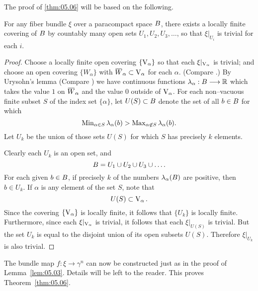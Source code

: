 \documentclass[../main]{subfiles}
\begin{document}
The proof of \ref{thm:05.06} will be based on the following.
\setcounter{theorem}{8}
\begin{lemma}
For any fiber bundle $\xi$ over a paracompact space $B$, there exists a locally finite covering of $B$ by countably many open sets $U_1, U_2, U_3, \ldots$, so that $\xi |_{U_i}$ is trivial for each $i$. 
\end{lemma}

\begin{proof}
Choose a locally finite open covering $\{\operatorname{V}_\alpha\}$ so that each $\xi |_{\operatorname{V}_\alpha}$ is trivial; and choose an open covering $\{W_\alpha\}$ with ${\xoverline W}_\alpha \subset \StiefelManifold_\alpha$ for each $\alpha$. (Compare \cite[p. 171]{kelley1955}.) By Urysohn's lemma (Compare \cite[\S33]{munkres2000topology}) we have continuous functions $\lambda_\alpha : B \longrightarrow \mathbb R$ which takes the value $1$ on ${\xoverline W}_\alpha$ and the value $0$ outside of $\operatorname{V}_\alpha$. For each non--vacuous finite subset $S$ of the index set $\{\alpha\}$, let $U(S) \subset B$ denote the set of all $b \in B$ for which \[\operatorname{Min}_{\alpha \in S} \lambda_\alpha(b) > \operatorname{Max}_{\alpha \not \in S} \lambda_\alpha(b).\] Let $U_k$ be the union of those sets $U(S)$ for which $S$ has precisely $k$ elements.

Clearly each $U_k$ is an open set, and \[B = U_1 \cup U_2 \cup U_3 \cup \ldots.\] For each given $b \in B$, if precisely $k$ of the numbers $\lambda_\alpha(B)$ are positive, then $b \in U_k$. If $\alpha$ is any element of the set $S$, note that \[U(S) \subset \operatorname{V}_\alpha.\] Since the covering $\{\operatorname{V}_\alpha\}$ is locally finite, it follows that $\{U_k\}$ is locally finite. Furthermore, since each $\xi |_{\operatorname{V}_\alpha}$ is trivial, it follows that each $\xi |_{U(S)}$ is trivial. But the set $U_k$ is equal to the disjoint union of its open subsets $U(S)$. Therefore $\xi |_{U_k}$ is also trivial. 
\end{proof}

The bundle map $f : \xi \longrightarrow \gamma^n$ can now be constructed just as in the proof of Lemma~\ref{lem:05.03}. Details will be left to the reader. This proves Theorem~\ref{thm:05.06}. 
\end{document}

